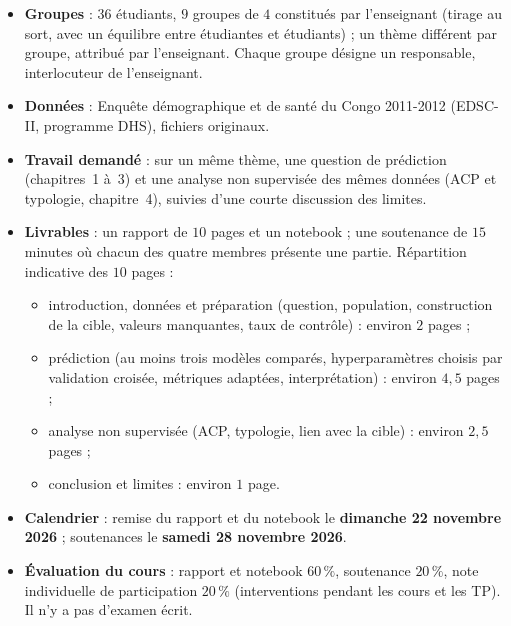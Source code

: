 \documentclass[11pt]{article}
\begin{document}
\begin{itemize}
  \item \textbf{Groupes} : $36$ étudiants, $9$ groupes de $4$ constitués par l'enseignant (tirage au sort, avec un équilibre entre étudiantes et étudiants) ; un thème différent par groupe, attribué par l'enseignant. Chaque groupe désigne un responsable, interlocuteur de l'enseignant.
  \item \textbf{Données} : Enquête démographique et de santé du Congo 2011-2012 (EDSC-II, programme DHS), fichiers originaux.
  \item \textbf{Travail demandé} : sur un même thème, une question de prédiction (chapitres~1 à~3) et une analyse non supervisée des mêmes données (ACP et typologie, chapitre~4), suivies d'une courte discussion des limites.
  \item \textbf{Livrables} : un rapport de $10$ pages et un notebook ; une soutenance de $15$ minutes où chacun des quatre membres présente une partie. Répartition indicative des $10$ pages :
  \begin{itemize}
    \item introduction, données et préparation (question, population, construction de la cible, valeurs manquantes, taux de contrôle) : environ $2$ pages ;
    \item prédiction (au moins trois modèles comparés, hyperparamètres choisis par validation croisée, métriques adaptées, interprétation) : environ $4{,}5$ pages ;
    \item analyse non supervisée (ACP, typologie, lien avec la cible) : environ $2{,}5$ pages ;
    \item conclusion et limites : environ $1$ page.
  \end{itemize}
  \item \textbf{Calendrier} : remise du rapport et du notebook le \textbf{dimanche 22 novembre 2026} ; soutenances le \textbf{samedi 28 novembre 2026}.
  \item \textbf{Évaluation du cours} : rapport et notebook $60\,\%$, soutenance $20\,\%$, note individuelle de participation $20\,\%$ (interventions pendant les cours et les TP). Il n'y a pas d'examen écrit.
\end{itemize}
\end{document}
